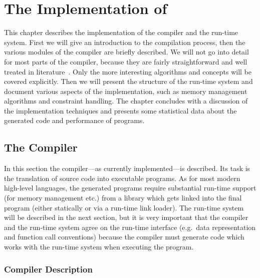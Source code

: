
\chapter{The Implementation of \turtle{}}
\label{cha:turtle-impl}

This chapter describes the implementation of the \turtle{} compiler
and the \turtle{} run-time system.  First we will give an introduction
to the compilation process, then the various modules of the compiler
are briefly described.  We will not go into detail for most parts of
the compiler, because they are fairly straightforward and well treated
in literature~\cite{appel98moderncompiler,grune00compilerdesign}.
Only the more interesting algorithms and concepts will be covered
explicitly.  Then we will present the structure of the run-time system
and document various aspects of the implementation, such as memory
management algorithms and constraint handling.  The chapter concludes
with a discussion of the implementation techniques and presents some
statistical data about the generated code and performance of \turtle{}
programs.


\section{The \turtle{} Compiler}
\label{sec:turtle-compiler}

In this section the \turtle{} compiler---as currently implemented---is
described.  Its task is the translation of \turtle{} source code into
executable programs.  As for most modern high-level languages, the
generated programs require substantial run-time support (for memory
management etc.) from a library which gets linked into the final
program (either statically or via a run-time link loader).  The
run-time system will be described in the next section, but it is very
important that the compiler and the run-time system agree on the
run-time in\-ter\-face (e.g.~data representation and function call
conventions) because the compiler must generate code which works with
the run-time system when executing the program.


\subsection{Compiler Description}
\label{sec:compiler-description}

